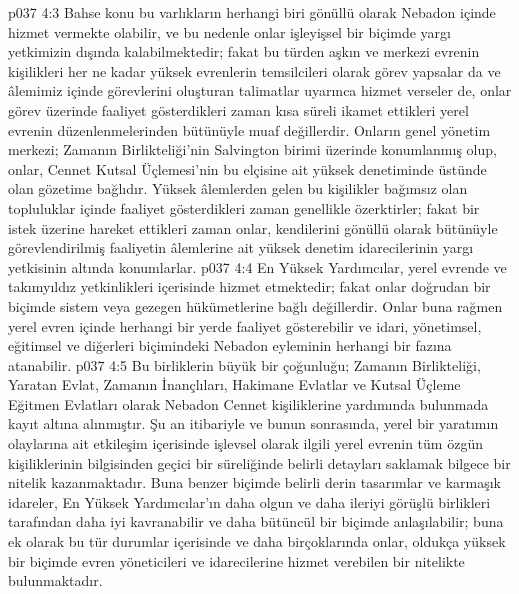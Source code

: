 \vs p037 4:3 Bahse konu bu varlıkların herhangi biri gönüllü olarak Nebadon içinde hizmet vermekte olabilir, ve bu nedenle onlar işleyişsel bir biçimde yargı yetkimizin dışında kalabilmektedir; fakat bu türden aşkın ve merkezi evrenin kişilikleri her ne kadar yüksek evrenlerin temsilcileri olarak görev yapsalar da ve âlemimiz içinde görevlerini oluşturan talimatlar uyarınca hizmet verseler de, onlar görev üzerinde faaliyet gösterdikleri zaman kısa süreli ikamet ettikleri yerel evrenin düzenlenmelerinden bütünüyle muaf değillerdir. Onların genel yönetim merkezi; Zamanın Birlikteliği’nin Salvington birimi üzerinde konumlanmış olup, onlar, Cennet Kutsal Üçlemesi’nin bu elçisine ait yüksek denetiminde üstünde olan gözetime bağlıdır. Yüksek âlemlerden gelen bu kişilikler bağımsız olan topluluklar içinde faaliyet gösterdikleri zaman genellikle özerktirler; fakat bir istek üzerine hareket ettikleri zaman onlar, kendilerini gönüllü olarak bütünüyle görevlendirilmiş faaliyetin âlemlerine ait yüksek denetim idarecilerinin yargı yetkisinin altında konumlarlar.
\vs p037 4:4 En Yüksek Yardımcılar, yerel evrende ve takımyıldız yetkinlikleri içerisinde hizmet etmektedir; fakat onlar doğrudan bir biçimde sistem veya gezegen hükümetlerine bağlı değillerdir. Onlar buna rağmen yerel evren içinde herhangi bir yerde faaliyet gösterebilir ve idari, yönetimsel, eğitimsel ve diğerleri biçimindeki Nebadon eyleminin herhangi bir fazına atanabilir.
\vs p037 4:5 Bu birliklerin büyük bir çoğunluğu; Zamanın Birlikteliği, Yaratan Evlat, Zamanın İnançlıları, Hakimane Evlatlar ve Kutsal Üçleme Eğitmen Evlatları olarak Nebadon Cennet kişiliklerine yardımında bulunmada kayıt altına alınmıştır. Şu an itibariyle ve bunun sonrasında, yerel bir yaratımın olaylarına ait etkileşim içerisinde işlevsel olarak ilgili yerel evrenin tüm özgün kişiliklerinin bilgisinden geçici bir süreliğinde belirli detayları saklamak bilgece bir nitelik kazanmaktadır. Buna benzer biçimde belirli derin tasarımlar ve karmaşık idareler, En Yüksek Yardımcılar’ın daha olgun ve daha ileriyi görüşlü birlikleri tarafından daha iyi kavranabilir ve daha bütüncül bir biçimde anlaşılabilir; buna ek olarak bu tür durumlar içerisinde ve daha birçoklarında onlar, oldukça yüksek bir biçimde evren yöneticileri ve idarecilerine hizmet verebilen bir nitelikte bulunmaktadır.
